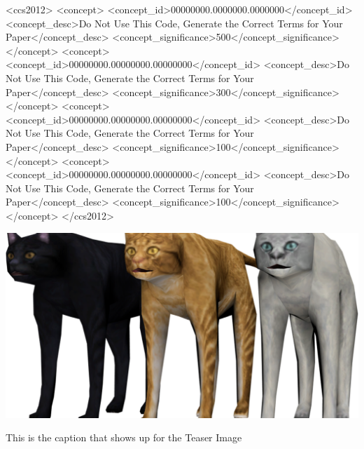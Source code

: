 \documentclass[sigconf, screen, review]{acmart}
\begin{document}
\begin{CCSXML}
	<ccs2012>
	<concept>
	<concept_id>00000000.0000000.0000000</concept_id>
	<concept_desc>Do Not Use This Code, Generate the Correct Terms for Your Paper</concept_desc>
	<concept_significance>500</concept_significance>
	</concept>
	<concept>
	<concept_id>00000000.00000000.00000000</concept_id>
	<concept_desc>Do Not Use This Code, Generate the Correct Terms for Your Paper</concept_desc>
	<concept_significance>300</concept_significance>
	</concept>
	<concept>
	<concept_id>00000000.00000000.00000000</concept_id>
	<concept_desc>Do Not Use This Code, Generate the Correct Terms for Your Paper</concept_desc>
	<concept_significance>100</concept_significance>
	</concept>
	<concept>
	<concept_id>00000000.00000000.00000000</concept_id>
	<concept_desc>Do Not Use This Code, Generate the Correct Terms for Your Paper</concept_desc>
	<concept_significance>100</concept_significance>
	</concept>
	</ccs2012>
\end{CCSXML}


\begin{teaserfigure}
	\includegraphics[width=\textwidth]{images/example.png}
	\caption{This is the caption that shows up for the Teaser Image}
	\label{fig:teaser}
\end{teaserfigure}
\end{document}
